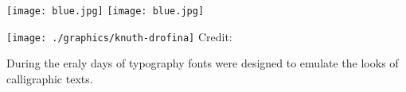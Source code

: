 \documentclass[a4paper]{article}
\begin{document}
\texttt{[image: blue.jpg]}%
\texttt{[image: blue.jpg]}%

\censoredtrue
{}
 \texttt{[image: ./graphics/knuth-drofina]}
   {\scriptsize \hfill Credit:}
  \caption{During the eraly days of typography fonts were designed to emulate the looks of calligraphic texts.}
\end{document}
